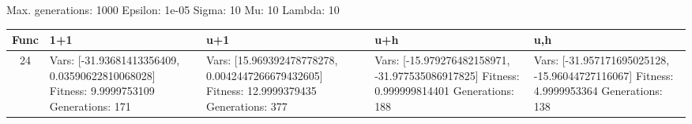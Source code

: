 \documentclass[landscape,11pt]{article}
\begin{document}
\newpage
Max. generations: 1000 Epsilon: 1e-05 Sigma: 10 Mu: 10 Lambda: 10 \\
\begin{tabular}{|c|p{5.4cm}|p{5.4cm}|p{5.4cm}|p{5.4cm}|}
\hline
Func & 1+1 & u+1 & u+h & u,h \\ 
\hline 24 & Vars: [-31.93681413356409, 0.03590622810068028] Fitness: 9.9999753109 Generations: 171 & Vars: [15.969392478778278, 0.0042447266679432605] Fitness: 12.9999379435 Generations: 377 & Vars: [-15.979276482158971, -31.977535086917825] Fitness: 0.999999814401 Generations: 188 & Vars: [-31.957171695025128, -15.96044727116067] Fitness: 4.9999953364 Generations: 138 \\
 \hline 
\end{tabular}
\end{document}
